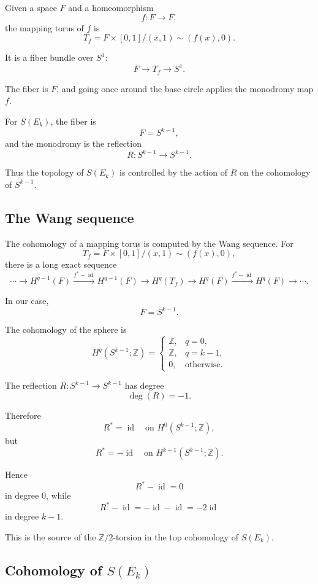 \documentclass[12pt,a4paper]{article}
\theoremstyle{notespace}
\begin{document}
Given a space \(F\) and a homeomorphism
\[
f:F\to F,
\]
the mapping torus of \(f\) is
\[
T_f=
F\times [0,1]
\big/
(x,1)\sim (f(x),0).
\]

It is a fiber bundle over \(S^1\):
\[
F\longrightarrow T_f\longrightarrow S^1.
\]

The fiber is \(F\), and going once around the base circle applies the monodromy map \(f\).

For \(S(E_k)\), the fiber is
\[
F=S^{k-1},
\]
and the monodromy is the reflection
\[
R:S^{k-1}\to S^{k-1}.
\]

Thus the topology of \(S(E_k)\) is controlled by the action of \(R\) on the cohomology of \(S^{k-1}\).

\subsection{The Wang sequence}

The cohomology of a mapping torus is computed by the Wang sequence. For
\[
T_f=
F\times [0,1]/(x,1)\sim(f(x),0),
\]
there is a long exact sequence
\[
\cdots
\to
H^{q-1}(F)
\xrightarrow{f^*-\operatorname{id}}
H^{q-1}(F)
\to
H^q(T_f)
\to
H^q(F)
\xrightarrow{f^*-\operatorname{id}}
H^q(F)
\to
\cdots .
\]

In our case,
\[
F=S^{k-1}.
\]

The cohomology of the sphere is
\[
H^q(S^{k-1};\mathbb{Z})
=
\begin{cases}
	\mathbb{Z}, & q=0,\\
	\mathbb{Z}, & q=k-1,\\
	0, & \text{otherwise}.
\end{cases}
\]

The reflection \(R:S^{k-1}\to S^{k-1}\) has degree
\[
\deg(R)=-1.
\]

Therefore
\[
R^*=\operatorname{id}
\quad\text{on }H^0(S^{k-1};\mathbb{Z}),
\]
but
\[
R^*=-\operatorname{id}
\quad\text{on }H^{k-1}(S^{k-1};\mathbb{Z}).
\]

Hence
\[
R^*-\operatorname{id}=0
\]
in degree \(0\), while
\[
R^*-\operatorname{id}
=
-\operatorname{id}-\operatorname{id}
=
-2\operatorname{id}
\]
in degree \(k-1\).

This is the source of the \(\mathbb{Z}/2\)-torsion in the top cohomology of \(S(E_k)\).

\subsection{Cohomology of \(S(E_k)\)}
\end{document}
